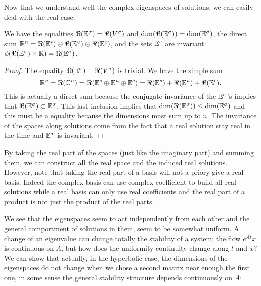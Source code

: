 Now that we understand well the complex eigenspaces of solutions, we can easily deal with the real case:
\begin{corollaire}
    We have the equalities $\Re(\mathbb{E}^\sigma)=\Re(V^\sigma)$ and $\dim(\Re(\mathbb{E}^\sigma))=\dim(\mathbb{E}^\sigma)$, the direct sum
    $\mathbb{R}^n = \Re(\mathbb{E}^s)\oplus\Re(\mathbb{E}^u)\oplus\Re(\mathbb{E}^c)$, and the sets $\mathbb{E}^s$ are invariant:
    $\phi(\Re(\mathbb{E}^\sigma)\times\mathbb{R})=\Re(\mathbb{E}^\sigma)$.
\end{corollaire}
\begin{proof}
The equality $\Re(\mathbb{E}^\sigma)=\Re(V^\sigma)$ is trivial. We have the simple sum
$$\mathbb{R}^n 
=\Re(\mathbb{C}^n) 
=\Re(\mathbb{E}^s\oplus\mathbb{E}^u\oplus\mathbb{E}^c)
= \Re(\mathbb{E}^s)+\Re(\mathbb{E}^u)+\Re(\mathbb{E}^c).$$
This is actually a direct sum because the conjugate invariance of the $\mathbb{E}^\sigma$'s implies that $\Re(\mathbb{E}^\sigma)\subset\mathbb{E}^\sigma$. This last inclusion implies that $\dim(\Re(\mathbb{E}^\sigma))\leq\dim(\mathbb{E}^\sigma)$ and this must be a equality because the dimensions must sum up to $n$. The invariance of the spaces along solutions come from the fact that a real solution stay real in the time and $\mathbb{E}^\sigma$ is invariant.
\end{proof}
\begin{remarque}
By taking the real part of the spaces (just like the imaginary part) and summing them, we can construct all the real space and the induced real solutions. However, note that taking the real part of a basis will not a priory give a real basis. Indeed the complex basis can use complex coefficient to build all real solutions while a real basis can only use real coefficients and the real part of a product is not just the product of the real parts. 
\end{remarque}
We see that the eigenspaces seem to act independently from each other and the general comportment of solutions in them, seem to be somewhat uniform. A change of an eigenvalue can change totally the stability of a system; the flow $e^{At}x$ is continuous on $A$, but how does the uniformity continuity change along $t$ and $x$? We can show that actually, in the hyperbolic case, the dimensions of the eigenspaces do not change when we chose a second matrix near enough the first one, in some sense the general stability structure depends continuously on $A$:

